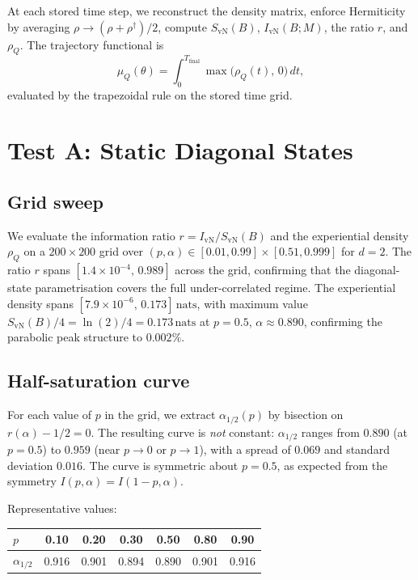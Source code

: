 \documentclass[12pt,a4paper]{article}
\newcommand{\SvN}{S_{\mathrm{vN}}}
\newcommand{\IvN}{I_{\mathrm{vN}}}
\newcommand{\rhoQ}{\rho_Q}
\newcommand{\muQ}{\mu_Q}
\newcommand{\nats}{\,\mathrm{nats}}
\begin{document}
At each stored time step, we reconstruct the density matrix,
enforce Hermiticity by averaging $\rho \to (\rho +
\rho^\dagger)/2$, compute $\SvN(B)$, $\IvN(B;M)$, the ratio $r$,
and $\rhoQ$.  The trajectory functional is
\begin{equation}
  \muQ(\theta) = \int_0^{T_{\mathrm{final}}}
  \max\!\bigl(\rhoQ(t),\, 0\bigr)\, dt,
\end{equation}
evaluated by the trapezoidal rule on the stored time grid.

\section{Test A: Static Diagonal States}\label{sec:testA}

\subsection{Grid sweep}

We evaluate the information ratio $r = \IvN/\SvN(B)$ and the
experiential density $\rhoQ$ on a $200 \times 200$ grid over
$(p, \alpha) \in [0.01, 0.99] \times [0.51, 0.999]$ for $d = 2$.
The ratio $r$ spans $[1.4 \times 10^{-4},\, 0.989]$ across the
grid, confirming that the diagonal-state parametrisation covers
the full under-correlated regime.  The experiential density spans
$[7.9 \times 10^{-6},\, 0.173]\nats$, with maximum value $\SvN(B)/4
= \ln(2)/4 = 0.173\nats$ at $p = 0.5$, $\alpha \approx 0.890$,
confirming the parabolic peak structure to $0.002\%$.

\subsection{Half-saturation curve}

For each value of $p$ in the grid, we extract $\alpha_{1/2}(p)$ by
bisection on $r(\alpha) - 1/2 = 0$.  The resulting curve is
\emph{not} constant: $\alpha_{1/2}$ ranges from $0.890$ (at
$p = 0.5$) to $0.959$ (near $p \to 0$ or $p \to 1$), with a
spread of $0.069$ and standard deviation $0.016$.  The curve is
symmetric about $p = 0.5$, as expected from the symmetry
$I(p, \alpha) = I(1-p, \alpha)$.

Representative values:
\begin{center}
\begin{tabular}{lcccccc}
  \toprule
  $p$ & 0.10 & 0.20 & 0.30 & 0.50 & 0.80 & 0.90 \\
  \midrule
  $\alpha_{1/2}$ & 0.916 & 0.901 & 0.894 & 0.890 & 0.901 & 0.916 \\
  \bottomrule
\end{tabular}
\end{center}
\end{document}
